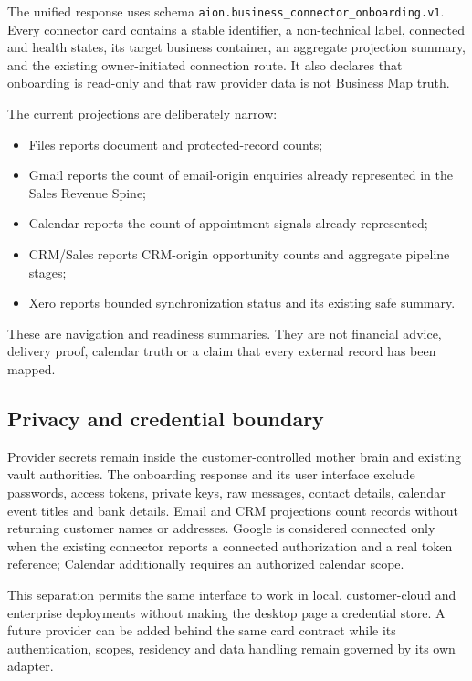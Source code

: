 The unified response uses schema
\texttt{aion.business\_connector\_onboarding.v1}.  Every connector card contains a
stable identifier, a non-technical label, connected and health states, its target
business container, an aggregate projection summary, and the existing owner-initiated
connection route.  It also declares that onboarding is read-only and that raw provider
data is not Business Map truth.

The current projections are deliberately narrow:

\begin{itemize}
  \item Files reports document and protected-record counts;
  \item Gmail reports the count of email-origin enquiries already represented in the
        Sales Revenue Spine;
  \item Calendar reports the count of appointment signals already represented;
  \item CRM/Sales reports CRM-origin opportunity counts and aggregate pipeline stages;
  \item Xero reports bounded synchronization status and its existing safe summary.
\end{itemize}

These are navigation and readiness summaries.  They are not financial advice,
delivery proof, calendar truth or a claim that every external record has been mapped.

\subsection{Privacy and credential boundary}

Provider secrets remain inside the customer-controlled mother brain and existing
vault authorities.  The onboarding response and its user interface exclude passwords,
access tokens, private keys, raw messages, contact details, calendar event titles and
bank details.  Email and CRM projections count records without returning customer names
or addresses.  Google is considered connected only when the existing connector reports
a connected authorization and a real token reference; Calendar additionally requires
an authorized calendar scope.

This separation permits the same interface to work in local, customer-cloud and
enterprise deployments without making the desktop page a credential store.  A future
provider can be added behind the same card contract while its authentication, scopes,
residency and data handling remain governed by its own adapter.

